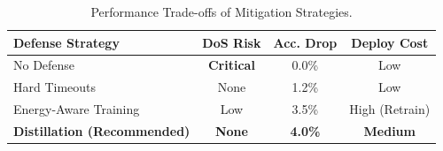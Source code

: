 \begin{table}[h]
    \centering
    \caption{Performance Trade-offs of Mitigation Strategies.}
    \label{tab:defense_comparison}
    \renewcommand{\arraystretch}{1.2}
    \begin{tabular}{l c c c}
        \toprule
        \textbf{Defense Strategy} & \textbf{DoS Risk} & \textbf{Acc. Drop} & \textbf{Deploy Cost} \\
        \midrule
        No Defense & \textbf{Critical} & 0.0\% & Low \\
        Hard Timeouts & None & 1.2\% & Low \\
        Energy-Aware Training & Low & 3.5\% & High (Retrain) \\
        \textbf{Distillation (Recommended)} & \textbf{None} & \textbf{4.0\%} & \textbf{Medium} \\
        \bottomrule
    \end{tabular}
\end{table}
